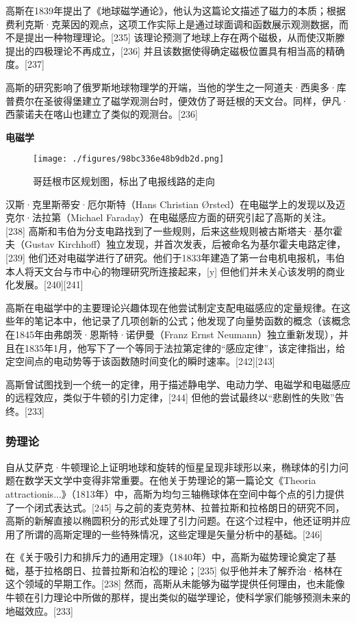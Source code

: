 高斯在1839年提出了《地球磁学通论》，他认为这篇论文描述了磁力的本质；根据费利克斯·克莱因的观点，这项工作实际上是通过球面调和函数展示观测数据，而不是提出一种物理理论。[235] 该理论预测了地球上存在两个磁极，从而使汉斯滕提出的四极理论不再成立，[236] 并且该数据使得确定磁极位置具有相当高的精确度。[237]

高斯的研究影响了俄罗斯地球物理学的开端，当他的学生之一阿道夫·西奥多·库普费尔在圣彼得堡建立了磁学观测台时，便效仿了哥廷根的天文台。同样，伊凡·西蒙诺夫在喀山也建立了类似的观测台。[236]

\textbf{电磁学}

\begin{figure}[ht]
\centering
\texttt{[image: ./figures/98bc336e48b9db2d.png]}
\caption{哥廷根市区规划图，标出了电报线路的走向} \label{fig_KRGS_23}
\end{figure}
汉斯·克里斯蒂安·厄尔斯特（Hans Christian Ørsted）在电磁学上的发现以及迈克尔·法拉第（Michael Faraday）在电磁感应方面的研究引起了高斯的关注。[238] 高斯和韦伯为分支电路找到了一些规则，后来这些规则被古斯塔夫·基尔霍夫（Gustav Kirchhoff）独立发现，并首次发表，后被命名为基尔霍夫电路定律，[239] 他们还对电磁学进行了研究。他们于1833年建造了第一台电机电报机，韦伯本人将天文台与市中心的物理研究所连接起来，[y] 但他们并未关心该发明的商业化发展。[240][241]

高斯在电磁学中的主要理论兴趣体现在他尝试制定支配电磁感应的定量规律。在这些年的笔记本中，他记录了几项创新的公式；他发现了向量势函数的概念（该概念在1845年由弗朗茨·恩斯特·诺伊曼（Franz Ernst Neumann）独立重新发现），并且在1835年1月，他写下了一个等同于法拉第定律的“感应定律”，该定律指出，给定空间点的电动势等于该函数随时间变化的瞬时速率。[242][243]

高斯曾试图找到一个统一的定律，用于描述静电学、电动力学、电磁学和电磁感应的远程效应，类似于牛顿的引力定律，[244] 但他的尝试最终以“悲剧性的失败”告终。[233]
\subsubsection{势理论}
自从艾萨克·牛顿理论上证明地球和旋转的恒星呈现非球形以来，椭球体的引力问题在数学天文学中变得非常重要。在他关于势理论的第一篇论文《Theoria attractionis...》（1813年）中，高斯为均匀三轴椭球体在空间中每个点的引力提供了一个闭式表达式。[245] 与之前的麦克劳林、拉普拉斯和拉格朗日的研究不同，高斯的新解直接以椭圆积分的形式处理了引力问题。在这个过程中，他还证明并应用了所谓的高斯定理的一些特殊情况，这些定理是矢量分析中的基础。[246]

在《关于吸引力和排斥力的通用定理》（1840年）中，高斯为磁势理论奠定了基础，基于拉格朗日、拉普拉斯和泊松的理论；[235] 似乎他并未了解乔治·格林在这个领域的早期工作。[238] 然而，高斯从未能够为磁学提供任何理由，也未能像牛顿在引力理论中所做的那样，提出类似的磁学理论，使科学家们能够预测未来的地磁效应。[233]
